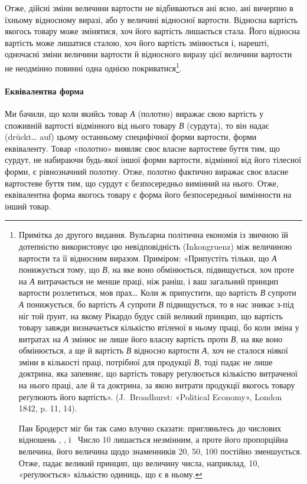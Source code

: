Отже, дійсні зміни величини вартости не відбиваються ані
ясно, ані вичерпно в їхньому відносному виразі, або у величині
відносної вартости. Відносна вартість якогось товару може змінятися,
хоч його вартість лишається стала. Його відносна вартість
може лишатися сталою, хоч його вартість змінюється і, нарешті,
одночасні зміни величини вартости й відносного виразу
цієї величини вартости не неодмінно повинні одна однією покриватися\footnote{
Примітка до другого видання. Вульґарна політична економія
із звичною їй дотепністю використовує цю невідповідність (Inkongruenz)
між величиною вартости та її відносним виразом. Приміром: «Припустіть
тільки, що \emph{А} понижується тому, що \emph{В}, на яке воно обмінюється,
підвищується, хоч проте на \emph{А} витрачається не менше праці, ніж раніш, і
ваш загальний принцип вартости розлетиться, мов прах\dots{} Коли ж припустити,
що вартість \emph{В} супроти \emph{А} понижується, бо вартість \emph{А} супроти
\emph{В} підвищується, то в нас зникає з-під ніг той ґрунт, на якому Рікардо
будує свій великий принцип, що вартість товару завжди визначається
кількістю втіленої в ньому праці, бо коли зміна у витратах на \emph{А} змінює
не лише його власну вартість проти \emph{В}, на яке воно обмінюється, а ще й
вартість \emph{В} відносно вартости \emph{А}, хоч не сталося ніякої зміни в
кількості праці, потрібної для продукції \emph{В}, тоді падає не лише доктрина,
яка запевняє, що вартість товару реґулюється кількістю витраченої на нього
праці, але й та доктрина, за якою витрати продукції якогось товару реґулюють
його вартість». (J.~Broadhurst: «Political Economy», London 1842, p. 11, 14).

Пан Бродерст міг би так само влучно сказати: пригляньтесь до числових відношень
, ,  і~ Число 10 лишається
незмінним, а проте його пропорційна величина, його величина щодо знаменників
20, 50, 100 постійно зменшується. Отже, падає великий принцип, що величину числа,
наприклад, 10, «реґулюється» кількістю одиниць, що є в ньому.
}.
\paragraph{Еквівалентна форма}

Ми бачили, що коли якийсь товар \emph{А} (полотно) виражає свою вартість у споживній вартості відмінного
від нього товару \emph{В} (сурдута), то він надає (drückt\dots{} auf) цьому останньому специфічної форми
вартости, форми еквіваленту. Товар «полотно» виявляє своє власне вартостеве буття тим, що сурдут, не
набираючи будь-якої іншої форми вартости, відмінної від його тілесної форми, є рівнозначний полотну.
Отже, полотно фактично виражає своє власне вартостеве буття тим, що сурдут є безпосередньо вимінний
на нього. Отже, еквівалентна форма якогось товару є форма його безпосередньої вимінности на інший
товар.

